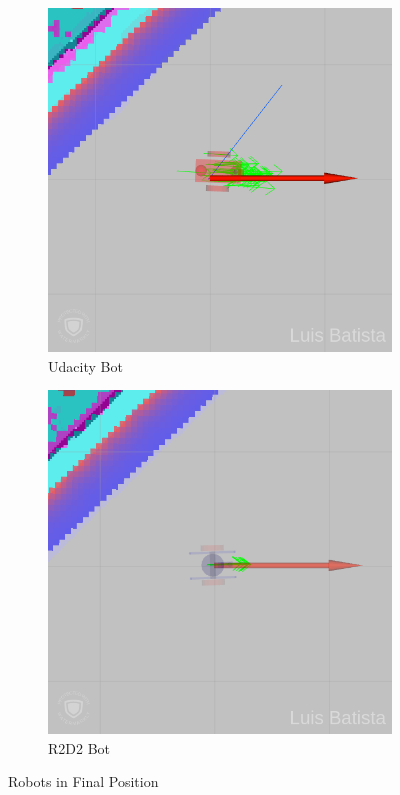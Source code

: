 \documentclass[10pt,journal,compsoc]{IEEEtran}
\begin{document}
\begin{figure}[H]
\centering
\begin{subfigure}{.5\linewidth}
  \centering
  \includegraphics[width=.95\linewidth]{ub_final.png}
  \caption{Udacity Bot}
  \label{fig:ub-final}
\end{subfigure}%
\begin{subfigure}{.5\linewidth}
  \centering
  \includegraphics[width=.95\linewidth]{r2d2_final.png}
  \caption{R2D2 Bot}
  \label{fig:r2d2-final}
\end{subfigure}
\caption{Robots in Final Position}
\label{fig:final}
\end{figure}
\end{document}
